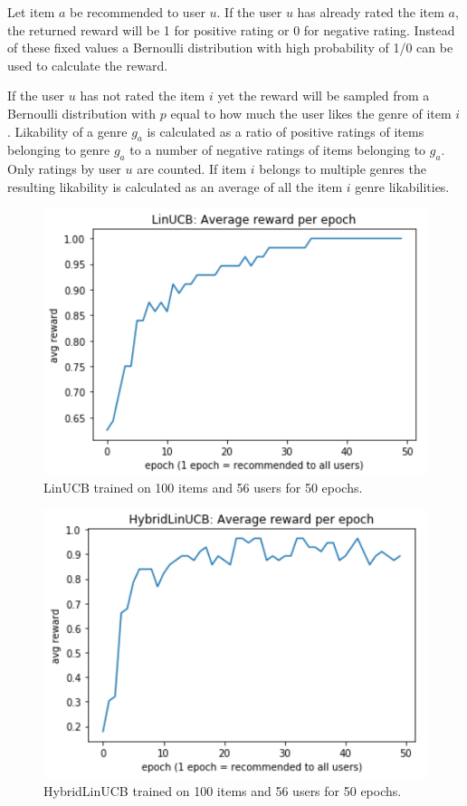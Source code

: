 \documentclass[12pt, titlepage]{article}
\begin{document}
Let item $a$ be recommended to user $u$.
If the user $u$ has already rated the item $a$, the returned reward will be 1 for positive rating or 0 for negative rating. Instead of these fixed values a Bernoulli distribution with high probability of 1/0 can be used to calculate the reward.

If the user $u$ has not rated the item $i$  yet the reward will be sampled from a Bernoulli distribution with $p$ equal to how much the user likes the genre of item $i$. Likability of a genre $g_a$ is calculated as a ratio of positive ratings of items belonging to genre $g_a$ to a number of negative ratings of items belonging to $g_a$. Only ratings by user $u$ are counted. If item $i$ belongs to multiple genres the resulting likability is calculated as an average of all the item $i$ genre likabilities.

\begin{figure}[h]
 \centering
 \includegraphics[scale=0.5]{img/LinUCB-100items-50epochs}
 \caption{LinUCB trained on 100 items and 56 users for 50 epochs.}
 \label{fig:linUCB-100it}
\end{figure}

\begin{figure}[h]
 \centering
 \includegraphics[scale=0.5]{img/HybridLinUCB-100items-50epochs}
 \caption{HybridLinUCB trained on 100 items and 56 users for 50 epochs. }
 \label{fig:HybridlinUCB-100it}
\end{figure}
\end{document}
